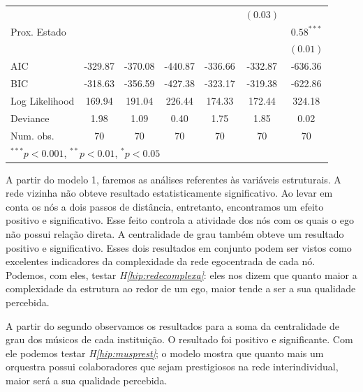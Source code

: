 \documentclass[a4paper, 12pt, openright, oneside, german, french, english, brazil]{abntex2}
\begin{document}
\begin{table}[!ht]
{\begin{tabular}{l c c c c c c }
			&               &               &               &               & $(0.03)$      &               \\
			Prox. Estado      &               &               &               &               &               & $0.58^{***}$  \\
			&               &               &               &               &               & $(0.01)$      \\
			\hline
			AIC                        & -329.87       & -370.08       & -440.87       & -336.66       & -332.87       & -636.36       \\
			BIC                        & -318.63       & -356.59       & -427.38       & -323.17       & -319.38       & -622.86       \\
			Log Likelihood             & 169.94        & 191.04        & 226.44        & 174.33        & 172.44        & 324.18        \\
			Deviance                   & 1.98          & 1.09          & 0.40          & 1.75          & 1.85          & 0.02          \\
			Num. obs.                  & 70            & 70            & 70            & 70            & 70            & 70            \\
			\hline
			\multicolumn{7}{l}{\scriptsize{$^{***}p<0.001$, $^{**}p<0.01$, $^*p<0.05$}}
		\end{tabular}
	}
	{	 }
	\end{table}

	
	A partir do modelo 1, faremos as análises referentes às variáveis estruturais. A rede vizinha não obteve resultado estatisticamente significativo. Ao levar em conta os nós a dois passos de distância, entretanto, encontramos um efeito positivo e significativo. Esse feito controla a atividade dos nós com os quais o ego não possui relação direta. A centralidade de grau também obteve um resultado positivo e significativo. Esses dois resultados em conjunto podem ser vistos como excelentes indicadores da complexidade da rede egocentrada de cada nó. Podemos, com eles, testar \textit{H\ref{hip:redecomplexa}}: eles nos dizem que quanto maior a complexidade da estrutura ao redor de um ego, maior tende a ser a sua qualidade percebida.
	
	A partir do segundo observamos os resultados para a soma da centralidade de grau dos músicos de cada instituição. O resultado foi positivo e significante. Com ele podemos testar \textit{H\ref{hip:musprest}}; o modelo mostra que quanto mais um orquestra possui colaboradores que sejam prestigiosos na rede interindividual, maior será a sua qualidade percebida. 
	
\end{document}
